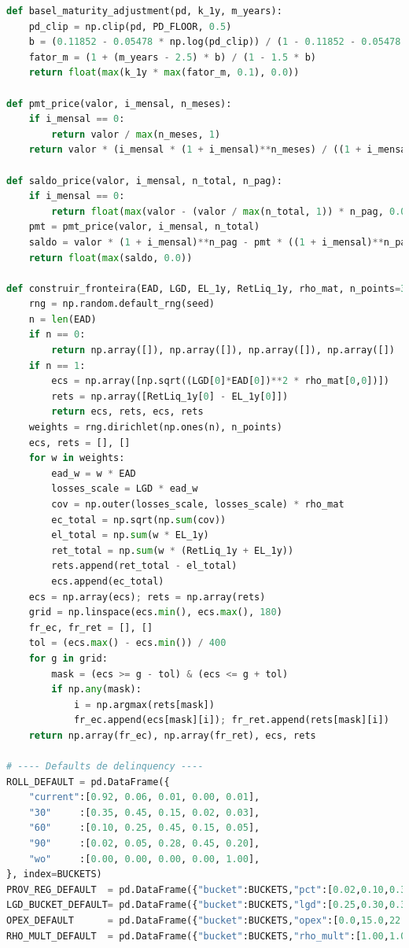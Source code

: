 \documentclass[11pt,a4paper]{article}
\newcommand{\1}{\mathbf{1}}
\begin{document}
\begin{lstlisting}[language=Python, caption={risk_frontier.py (versão completa com normalização por prazo e visões)}]
def basel_maturity_adjustment(pd, k_1y, m_years):
    pd_clip = np.clip(pd, PD_FLOOR, 0.5)
    b = (0.11852 - 0.05478 * np.log(pd_clip)) / (1 - 0.11852 - 0.05478 * np.log(pd_clip))
    fator_m = (1 + (m_years - 2.5) * b) / (1 - 1.5 * b)
    return float(max(k_1y * max(fator_m, 0.1), 0.0))

def pmt_price(valor, i_mensal, n_meses):
    if i_mensal == 0:
        return valor / max(n_meses, 1)
    return valor * (i_mensal * (1 + i_mensal)**n_meses) / ((1 + i_mensal)**n_meses - 1)

def saldo_price(valor, i_mensal, n_total, n_pag):
    if i_mensal == 0:
        return float(max(valor - (valor / max(n_total, 1)) * n_pag, 0.0))
    pmt = pmt_price(valor, i_mensal, n_total)
    saldo = valor * (1 + i_mensal)**n_pag - pmt * ((1 + i_mensal)**n_pag - 1) / i_mensal
    return float(max(saldo, 0.0))

def construir_fronteira(EAD, LGD, EL_1y, RetLiq_1y, rho_mat, n_points=30000, seed=SEED):
    rng = np.random.default_rng(seed)
    n = len(EAD)
    if n == 0:
        return np.array([]), np.array([]), np.array([]), np.array([])
    if n == 1:
        ecs = np.array([np.sqrt((LGD[0]*EAD[0])**2 * rho_mat[0,0])])
        rets = np.array([RetLiq_1y[0] - EL_1y[0]])
        return ecs, rets, ecs, rets
    weights = rng.dirichlet(np.ones(n), n_points)
    ecs, rets = [], []
    for w in weights:
        ead_w = w * EAD
        losses_scale = LGD * ead_w
        cov = np.outer(losses_scale, losses_scale) * rho_mat
        ec_total = np.sqrt(np.sum(cov))
        el_total = np.sum(w * EL_1y)
        ret_total = np.sum(w * (RetLiq_1y + EL_1y))
        rets.append(ret_total - el_total)
        ecs.append(ec_total)
    ecs = np.array(ecs); rets = np.array(rets)
    grid = np.linspace(ecs.min(), ecs.max(), 180)
    fr_ec, fr_ret = [], []
    tol = (ecs.max() - ecs.min()) / 400
    for g in grid:
        mask = (ecs >= g - tol) & (ecs <= g + tol)
        if np.any(mask):
            i = np.argmax(rets[mask])
            fr_ec.append(ecs[mask][i]); fr_ret.append(rets[mask][i])
    return np.array(fr_ec), np.array(fr_ret), ecs, rets

# ---- Defaults de delinquency ----
ROLL_DEFAULT = pd.DataFrame({
    "current":[0.92, 0.06, 0.01, 0.00, 0.01],
    "30"     :[0.35, 0.45, 0.15, 0.02, 0.03],
    "60"     :[0.10, 0.25, 0.45, 0.15, 0.05],
    "90"     :[0.02, 0.05, 0.28, 0.45, 0.20],
    "wo"     :[0.00, 0.00, 0.00, 0.00, 1.00],
}, index=BUCKETS)
PROV_REG_DEFAULT  = pd.DataFrame({"bucket":BUCKETS,"pct":[0.02,0.10,0.30,0.50,1.00]})
LGD_BUCKET_DEFAULT= pd.DataFrame({"bucket":BUCKETS,"lgd":[0.25,0.30,0.35,0.40,0.45]})
OPEX_DEFAULT      = pd.DataFrame({"bucket":BUCKETS,"opex":[0.0,15.0,22.0,35.0,80.0]})
RHO_MULT_DEFAULT  = pd.DataFrame({"bucket":BUCKETS,"rho_mult":[1.00,1.05,1.10,1.15,1.20]})


\end{lstlisting}
\end{document}
